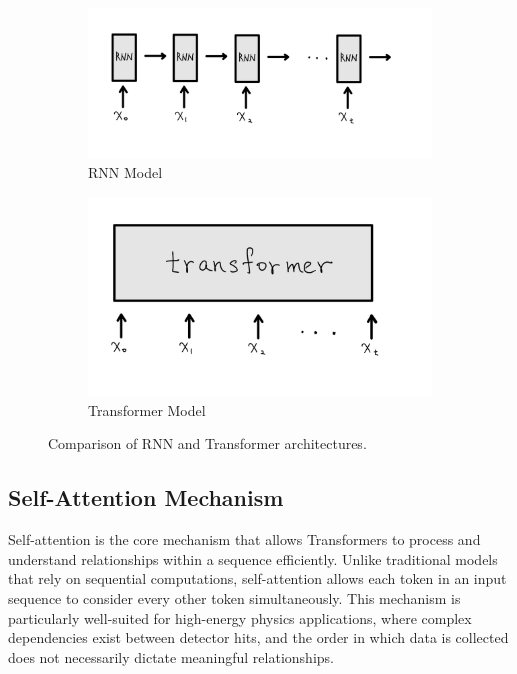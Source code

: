 \begin{figure}[ht]
    \centering
    \begin{subfigure}[b]{0.45\textwidth}
        \centering
        \includegraphics[width=\textwidth]{Figures/rnn.jpeg}
        \caption{RNN Model}
        \label{fig:rnn}
    \end{subfigure}
    \hfill
    \begin{subfigure}[b]{0.45\textwidth}
        \centering
        \includegraphics[width=\textwidth]{Figures/transformer.jpeg}
        \caption{Transformer Model}
        \label{fig:transformer}
    \end{subfigure}
    \caption{Comparison of RNN and Transformer architectures.}
    \label{fig:comparison}
\end{figure}

\subsection{Self-Attention Mechanism}

Self-attention is the core mechanism that allows Transformers to process and understand relationships within a sequence efficiently. Unlike traditional models that rely on sequential computations, self-attention allows each token in an input sequence to consider every other token simultaneously. This mechanism is particularly well-suited for high-energy physics applications, where complex dependencies exist between detector hits, and the order in which data is collected does not necessarily dictate meaningful relationships.

